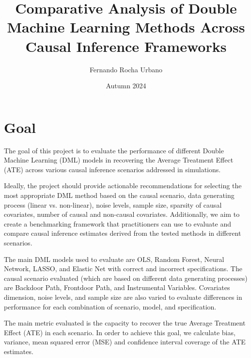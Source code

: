 \documentclass{article}
\title{Comparative Analysis of Double Machine Learning Methods Across Causal Inference Frameworks}
\author{Fernando Rocha Urbano}
\date{Autumn 2024}
\numberwithin{equation}{section}
\begin{document}
\maketitle

\section{Goal}

The goal of this project is to evaluate the performance of different Double Machine Learning (DML) models in recovering the Average Treatment Effect (ATE) across various causal inference scenarios addressed in simulations.

Ideally, the project should provide actionable recommendations for selecting the most appropriate DML method based on the causal scenario, data generating process (linear vs. non-linear), noise levels, sample size, sparsity of causal covariates, number of causal and non-causal covariates. Additionally, we aim to create a benchmarking framework that practitioners can use to evaluate and compare causal inference estimates derived from the tested methods in different scenarios.

The main DML models used to evaluate are OLS, Random Forest, Neural Network, LASSO, and Elastic Net with correct and incorrect specifications. The causal scenario evaluated (which are based on different data generating processes) are Backdoor Path, Frontdoor Path, and Instrumental Variables. Covariates dimension, noise levels, and sample size are also varied to evaluate differences in performance for each combination of scenario, model, and specification.

The main metric evaluated is the capacity to recover the true Average Treatment Effect (ATE) in each scenario. In order to achieve this goal, we calculate bias, variance, mean squared error (MSE) and confidence interval coverage of the ATE estimates.
\end{document}
